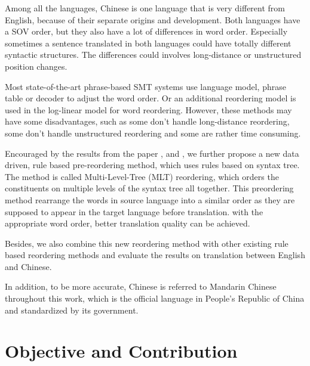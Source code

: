 Among all the languages, Chinese is one language that is very different from English, because of their separate origins and development. Both languages have a SOV order, but they also have a lot of differences in word order. Especially sometimes a sentence translated in both languages could have totally different syntactic structures. The differences could involves long-distance or unstructured position changes.

Most state-of-the-art phrase-based SMT systems use language model, phrase table or decoder to adjust the word order. Or an additional reordering model is used in the log-linear model for word reordering. However, these methods may have some disadvantages, such as some don't handle long-distance reordering, some don't handle unstructured reordering and some are rather time consuming.

Encouraged by the results from the paper \cite{short}, \cite{long} and \cite{tree}, we further propose a new data driven, rule based pre-reordering method, which uses rules based on syntax tree. The method is called Multi-Level-Tree (MLT) reordering, which orders the constituents on multiple levels of the syntax tree all together. This preordering method rearrange the words in source language into a similar order as they are supposed to appear in the target language before translation. with the appropriate word order, better translation quality can be achieved.

Besides, we also combine this new reordering method with other existing rule based reordering methods and evaluate the results on translation between English and Chinese. %


In addition, to be more accurate, Chinese is referred to Mandarin Chinese throughout this work, which is the official language in People's Republic of China and standardized by its government.

\section{Objective and Contribution}
\label{ch:Introduction:sec:ObjectiveAndContribution}

